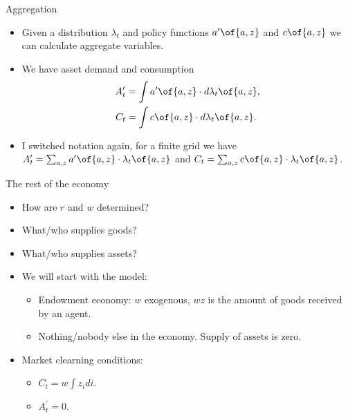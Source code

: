 \documentclass[11pt,xcolor={dvipsnames},aspectratio=159,hyperref={pdftex,pdfpagemode=UseNone,hidelinks,pdfdisplaydoctitle=true},usepdftitle=false]{beamer}
\begin{document}
   \begin{frame}{Aggregation}   
    \begin{itemize}
        \item Given a distribution $\lambda_t$ and policy functions $a^\prime\of{a,z}$ and $c\of{a,z}$ we can calculate aggregate variables.
        \item We have asset demand and consumption\begin{align*}
            A^\prime_t &= \int  a^\prime\of{a,z} \cdot d\lambda_t\of{a,z}, \\
            C_t &= \int  c\of{a,z} \cdot d\lambda_t\of{a,z}.
        \end{align*}
        \item I switched notation again, for a finite grid we have $A^\prime_t = \sum_{a,z} a^\prime\of{a,z} \cdot \lambda_t\of{a,z}$ and $C_t = \sum_{a,z} c\of{a,z} \cdot \lambda_t\of{a,z}$.
\end{itemize}
   \end{frame}


   \begin{frame}{The rest of the economy}   
    \begin{itemize}
        \item How are $r$ and $w$ determined? 
        \item What/who supplies goods?
        \item What/who supplies assets?
        \item We will start with the  model: 
        \begin{itemize}
            \item Endowment economy: $w$ exogenous, $wz$ is the amount of goods received by an agent.
            \item Nothing/nobody else in the economy. Supply of assets is zero. 
        \end{itemize}
        \item Market clearning conditions: \begin{itemize}
        \item {} $C_t = w\int z_i di.$
        \item {} $A^\prime_t = 0$.
\end{itemize}
\end{itemize}
   \end{frame}
\end{document}

